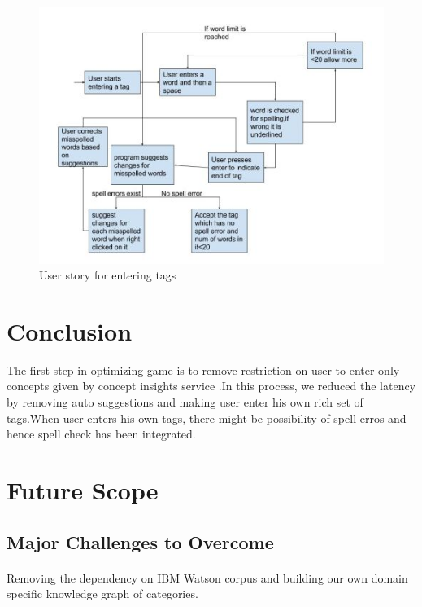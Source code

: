 \documentclass[12pt]{article}
\begin{document}
\begin{figure}[h]
\begin{center}
\includegraphics{images/userstory1_mod.jpg}
\caption{User story for entering tags}
\label{User story for entering tags}
\end{center}
\end{figure}




\newpage
\section{Conclusion}
 The first step in optimizing game is to remove restriction on user to enter only concepts given by concept insights service .In this process, we reduced the latency by removing auto suggestions and making user enter his own rich set of tags.When user enters his own tags, there might be possibility of spell erros and hence spell check has been integrated.

\newpage
\section{Future Scope}
\subsection{Major Challenges to Overcome}
\paragraph{} Removing the dependency on IBM Watson corpus and building our own domain specific knowledge graph of categories.
\end{document}
